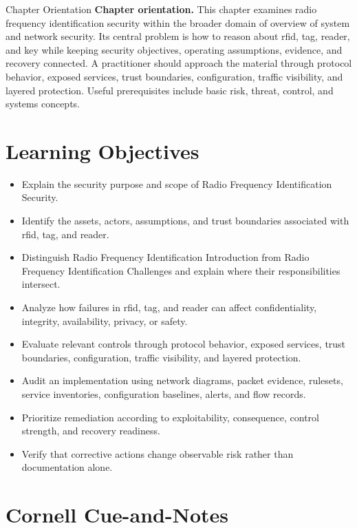 \documentclass[11pt,letterpaper]{article}
\title{\CornellDocumentTitle}
\author{}
\date{}
\begin{document}
\maketitle
\begin{CornellOverviewBox}{Chapter Orientation}
\textbf{Chapter orientation.} This chapter examines radio frequency identification security within the broader domain of overview of system and network security. Its central problem is how to reason about rfid, tag, reader, and key while keeping security objectives, operating assumptions, evidence, and recovery connected. A practitioner should approach the material through protocol behavior, exposed services, trust boundaries, configuration, traffic visibility, and layered protection. Useful prerequisites include basic risk, threat, control, and systems concepts.
\end{CornellOverviewBox}
\section*{Learning Objectives}
\begin{itemize}
\item Explain the security purpose and scope of Radio Frequency Identification Security.
\item Identify the assets, actors, assumptions, and trust boundaries associated with rfid, tag, and reader.
\item Distinguish Radio Frequency Identification Introduction from Radio Frequency Identification Challenges and explain where their responsibilities intersect.
\item Analyze how failures in rfid, tag, and reader can affect confidentiality, integrity, availability, privacy, or safety.
\item Evaluate relevant controls through protocol behavior, exposed services, trust boundaries, configuration, traffic visibility, and layered protection.
\item Audit an implementation using network diagrams, packet evidence, rulesets, service inventories, configuration baselines, alerts, and flow records.
\item Prioritize remediation according to exploitability, consequence, control strength, and recovery readiness.
\item Verify that corrective actions change observable risk rather than documentation alone.
\end{itemize}
\section*{Cornell Cue-and-Notes}
\end{document}
